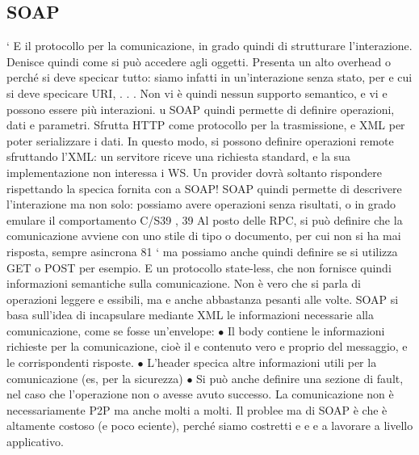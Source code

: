 \subsection{SOAP}
`
E il protocollo per la comunicazione, in grado quindi di strutturare l'interazione.
Denisce quindi come si può accedere agli oggetti. Presenta un alto overhead
o
perché si deve specicar tutto: siamo infatti in un'interazione senza stato, per
e
cui si deve specicare URI, . . . Non vi è quindi nessun supporto semantico, e vi
e
possono essere più interazioni.
u
SOAP quindi permette di definire operazioni, dati e parametri. Sfrutta
HTTP come protocollo per la trasmissione, e XML per poter serializzare i dati.
In questo modo, si possono definire operazioni remote sfruttando l'XML: un
servitore riceve una richiesta standard, e la sua implementazione non interessa i
WS. Un provider dovrà soltanto rispondere rispettando la specica fornita con
a
SOAP!
SOAP quindi permette di descrivere l'interazione ma non solo: possiamo
avere operazioni senza risultati, o in grado emulare il comportamento C/S39 ,
39 Al posto delle RPC, si può definire che la comunicazione avviene con uno stile di tipo
o
documento, per cui non si ha mai risposta, sempre asincrona
81
`
ma possiamo anche quindi definire se si utilizza GET o POST per esempio. E
un protocollo state-less, che non fornisce quindi informazioni semantiche sulla
comunicazione. Non è vero che si parla di operazioni leggere e essibili, ma
e
anche abbastanza pesanti alle volte.
SOAP si basa sull'idea di incapsulare mediante XML le informazioni necessarie alla comunicazione, come se fosse
un'envelope:
$\bullet$ Il body contiene le informazioni richieste per la comunicazione, cioè il
e
contenuto vero e proprio del messaggio, e le corrispondenti risposte.
$\bullet$ L'header specica altre informazioni utili per la comunicazione (es, per la
sicurezza)
$\bullet$ Si può anche definire una sezione di fault, nel caso che l'operazione non
o
avesse avuto successo.
La comunicazione non è necessariamente P2P ma anche molti a molti. Il problee
ma di SOAP è che è altamente costoso (e poco eciente), perché siamo costretti
e
e
e
a lavorare a livello applicativo.

